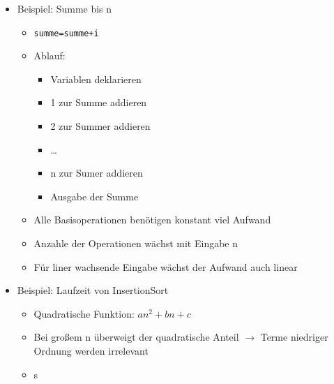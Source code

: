 		\begin{itemize}
			\item Beispiel: Summe bis n
			\begin{itemize}
				\item \texttt{summe=summe+i}
				\item Ablauf:
				\begin{itemize}
					\item Variablen deklarieren
					\item 1 zur Summe addieren
					\item 2 zur Summer addieren
					\item \dots
					\item n zur Sumer addieren
					\item Ausgabe der Summe
				\end{itemize}
				\item Alle Basisoperationen benötigen konstant viel Aufwand 
				\item Anzahle der Operationen wächst mit Eingabe n
				\item Für liner wachsende Eingabe wächst der Aufwand auch linear
			\end{itemize}
			\item Beispiel: Laufzeit von InsertionSort
			\begin{itemize}
				\item Quadratische Funktion: $an^2 + bn + c$
				\item Bei gro\ss em n überweigt der quadratische Anteil $\rightarrow$ Terme niedriger Ordnung werden irrelevant
				\item s
			\end{itemize}
		\end{itemize}


